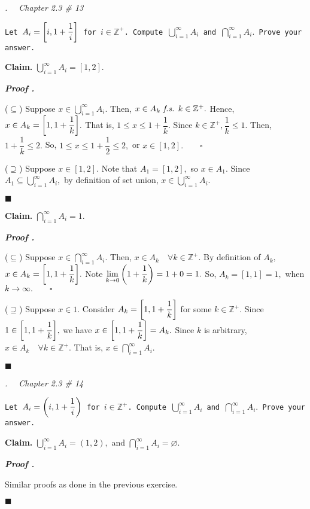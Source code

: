 \documentclass[11pt,letter]{article}
\newcounter{nq}[section]
\newcounter{np}[section]
\newenvironment*{p}{\par\noindent\textbf{\textit{Proof \stepcounter{np}\thenp. }}\par}{\par\hfill $\blacksquare$\par}
\newenvironment*{q}[1]{\noindent\emph{\thesection.\stepcounter{nq}\thenq$\quad $ #1}\par\noindent\texttt}{}
\newenvironment*{clm}{\par\noindent\textbf{Claim. }}{\par}
\def\Z{{\mathbb{Z}}}
\def\Zp{{\Z^+}}
\def\emptyset{\varnothing}
\def\fs{\emph{ f.s. }}
\def\dsst{\displaystyle}
\begin{document}
\begin{framed}\begin{q}
	{Chapter 2.3 \# 13}
	{Let $A_i=\qty[i,1+\dfrac{1}{i}]$ for $i\in\Zp$. Compute $\dsst\bigcup_{i=1}^\infty A_i$ and $\dsst\bigcap_{i=1}^\infty A_i.$ Prove your answer.}
\end{q}\end{framed}
\begin{clm}
	$\dsst\bigcup_{i=1}^\infty A_i=[1,2].$
\end{clm}
\begin{p}
	($\subseteq$) Suppose $x\in\dsst\bigcup_{i=1}^\infty A_i.$ Then, $x\in A_k\fs k\in\Zp.$ Hence, $x\in A_k=\qty[1,1+\dfrac{1}{k}].$ That is, $1\leq x\leq1+\dfrac{1}{k}.$ Since $k\in\Zp,\dfrac{1}{k}\leq1.$ Then, $1+\dfrac{1}{k}\leq2.$ So, $1\leq x\leq1+\dfrac{1}{2}\leq2,$ or $x\in[1,2].\qquad\square$\par 
	($\supseteq$) Suppose $x\in[1,2].$ Note that $A_1=[1,2],$ so $x\in A_1.$ Since $A_1\dsst\subseteq\bigcup_{i=1}^\infty A_i,$ by definition of set union, $x\in\dsst\bigcup_{i=1}^\infty A_i.$
\end{p}
\begin{clm}
	$\dsst\bigcap_{i=1}^\infty A_i=\qty{1}.$
\end{clm}
\begin{p}
	($\subseteq$) Suppose $x\in\dsst\bigcap_{i=1}^\infty A_i.$ Then, $x\in A_k\quad\forall k\in\Zp.$ By definition of $A_k,$ $x\in A_k=\qty[1,1+\dfrac{1}{k}].$ Note $\dsst\lim_{k\to0}\qty(1+\dfrac{1}{k})=1+0=1.$ So, $A_k=[1,1]=\qty{1},$ when $k\to\infty.\qquad\square$\par 
	($\supseteq$) Suppose $x\in\qty{1}.$ Consider $A_k=\qty[1,1+\dfrac{1}{k}]$ for some $k\in\Zp.$ Since $1\in\qty[1,1+\dfrac{1}{k}],$ we have $x\in\qty[1,1+\dfrac{1}{k}]=A_k.$ Since $k$ is arbitrary, $x\in A_k\quad\forall k\in\Zp.$ That is, $x\in\dsst\bigcap_{i=1}^\infty A_i.$	
\end{p}

\begin{framed}\begin{q}
	{Chapter 2.3 \# 14}
	{Let $A_i=\qty(i,1+\dfrac{1}{i})$ for $i\in\Zp$. Compute $\dsst\bigcup_{i=1}^\infty A_i$ and $\dsst\bigcap_{i=1}^\infty A_i.$ Prove your answer.}
\end{q}\end{framed}
\begin{clm}
	$\dsst\bigcup_{i=1}^\infty A_i=(1,2),$ and $\dsst\bigcap_{i=1}^\infty A_i=\emptyset.$
\end{clm}
\begin{p}
	Similar proofs as done in the previous exercise.	
\end{p}
\end{document}
